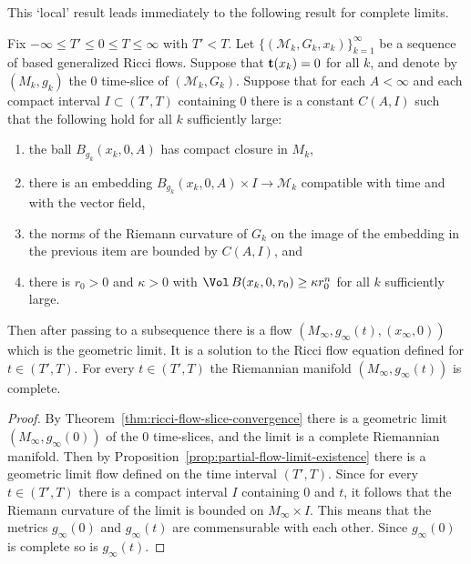 This `local' result leads immediately to the following result for
complete limits.

\begin{theorem}\label{thm:ricci-flow-geometric-limit-existence}
\notready
\label{flowlimit}

Fix $-\infty\le T'\le 0\le T\le \infty$ with $T'<T$. Let $\{({\mathcal
M}_k,G_k,x_k)\}_{k=1}^\infty$ be a sequence of based generalized Ricci flows.
Suppose that ${\bf t}(x_k)=0$ for all $k$, and denote by $(M_k,g_k)$ the $0$
time-slice of $({\mathcal M}_k,G_k)$. Suppose that for each $A<\infty$ and each
compact interval $I\subset (T',T)$ containing $0$ there is a constant $C(A,I)$
such that the following hold for all $k$ sufficiently large:
\begin{enumerate}
\item[(1)]  the ball
$B_{g_k}(x_k,0,A)$ has compact closure in $M_k$, \item[(2)]  there is an
embedding $B_{g_k}(x_k,0,A)\times I\to {\mathcal M}_k$ compatible with time and
with the vector field,
\item[(3)] the norms of the Riemann curvature of $G_k$ on the image of the embedding in the
previous item are  bounded by $C(A,I)$, and
\item[(4)] there is $r_0>0$ and $\kappa>0$ with $\Vol\,B(x_k,0,r_0)\ge \kappa r_0^n$
for all $k$ sufficiently large.
\end{enumerate}
 Then after passing to a subsequence there is a
flow  $(M_\infty,g_\infty(t),(x_\infty,0))$ which is the geometric
limit. It is a solution to the Ricci flow equation defined for $t\in
(T',T)$. For every $t\in (T',T)$ the Riemannian manifold
$(M_\infty,g_\infty(t))$ is complete.
\end{theorem}


\begin{proof}
\sketch
{}
By Theorem~\ref{thm:ricci-flow-slice-convergence} there is a geometric limit $(M_\infty,g_\infty(0))$
of the $0$ time-slices, and the limit  is a complete Riemannian manifold. Then
by Proposition~\ref{prop:partial-flow-limit-existence} there is a geometric limit flow defined
on the time interval $(T',T)$. Since for every $t\in (T',T)$ there is a compact
interval $I$ containing $0$ and $t$, it follows that the Riemann curvature of
the limit is bounded on $M_\infty\times I$. This means that the metrics
$g_\infty(0)$ and $g_\infty(t)$ are commensurable with each other. Since
$g_\infty(0)$ is complete so is $g_\infty(t)$.
\end{proof}



